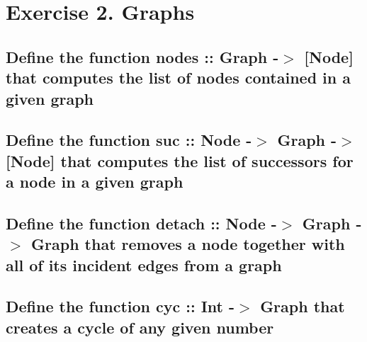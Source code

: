 \section{Exercise 2. Graphs}

\subsection{Define the function nodes :: Graph -$>$ [Node] that computes the list of nodes contained in a given graph}



\subsection{Define the function suc :: Node -$>$ Graph -$>$ [Node] that computes the list of successors for a node in a given graph}



\subsection{Define the function detach :: Node -$>$ Graph -$>$ Graph that removes a node together with all of its incident edges from a graph}



\subsection{Define the function cyc :: Int -$>$ Graph that creates a cycle of any given number}



